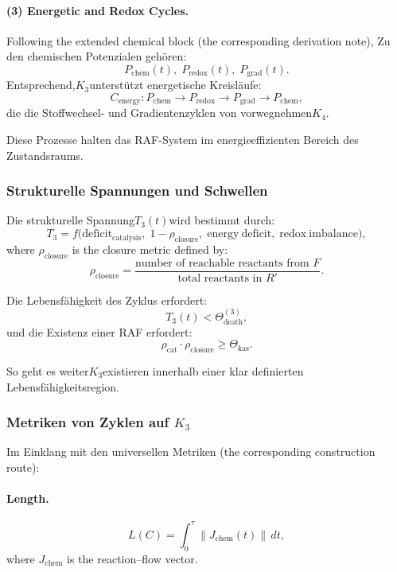 \paragraph{(3) Energetic and Redox Cycles.}

Following the extended chemical block (the corresponding derivation note),
Zu den chemischen Potenzialen gehören:
\[
  P_{\mathrm{chem}}(t),\;
  P_{\mathrm{redox}}(t),\;
  P_{\mathrm{grad}}(t).
\]
Entsprechend,$K_3$unterstützt energetische Kreisläufe:
\[
  C_{\mathrm{energy}}:
  P_{\mathrm{chem}}\to P_{\mathrm{redox}}
    \to P_{\mathrm{grad}} \to P_{\mathrm{chem}},
\]
die die Stoffwechsel- und Gradientenzyklen von vorwegnehmen$K_4$.

Diese Prozesse halten das RAF-System im energieeffizienten Bereich
des Zustandsraums.

\subsubsection{Strukturelle Spannungen und Schwellen}

Die strukturelle Spannung$T_3(t)$wird bestimmt durch:
\[
T_3 =
   f\bigl(
     \mathrm{deficit}_{\mathrm{catalysis}},\;
     1-\rho_{\mathrm{closure}},\;
     \mathrm{energy\ deficit},\;
     \mathrm{redox\ imbalance}
   \bigr),
\]
where $\rho_{\mathrm{closure}}$ is the closure metric defined by:
\[
  \rho_{\mathrm{closure}} =
    \frac{\text{number of reachable reactants from } F}
         {\text{total reactants in } R'}.
\]

Die Lebensfähigkeit des Zyklus erfordert:
\[
  T_3(t) < \Theta_{\mathrm{death}}^{(3)},
\]
und die Existenz einer RAF erfordert:
\[
  \rho_{\mathrm{cat}} \cdot \rho_{\mathrm{closure}}
  \ge \Theta_{\mathrm{kas}}.
\]

So geht es weiter$K_3$existieren innerhalb einer klar definierten Lebensfähigkeitsregion.

\subsubsection{Metriken von Zyklen auf \texorpdfstring{$K_3$}{K_3}}

Im Einklang mit den universellen Metriken (the corresponding construction route):

\paragraph{Length.}
\[
  L(C) = \int_0^\tau \|J_{\mathrm{chem}}(t)\|\, dt,
\]
where $J_{\mathrm{chem}}$ is the reaction–flow vector.

